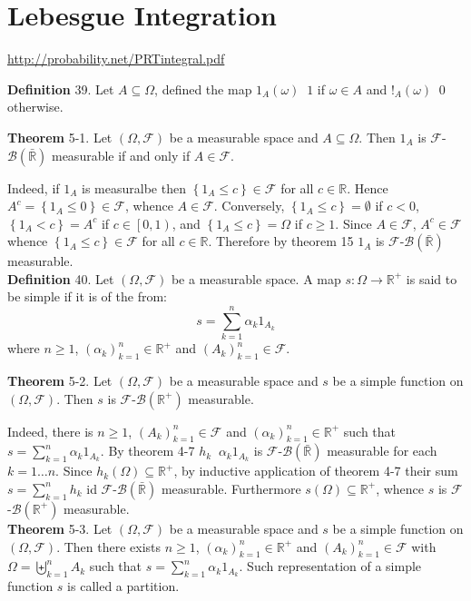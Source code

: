 \documentclass[a4paper]{article}
\newcommand{\obj}[1]{\left\{ #1 \right \}}
\newcommand{\clop}[1]{\left [ #1 \right )}
\newcommand{\brac}[1]{\left ( #1 \right )}
\newcommand{\Rbar}{{\bar{\mathbb{R}}}}
\newcommand{\Real}{\mathbb{R}}
\newcommand{\Fcal}{\mathcal{F}}
\newcommand{\borel}[1]{\mathcal{B}\brac{#1}}
\newcommand{\defn}{\mathop{\overset{\Delta}{=}}\nolimits}
\begin{document}
\section{Lebesgue Integration} %
\label{sec:tut_5}
\url{http://probability.net/PRTintegral.pdf}

\noindent \textbf{Definition} 39.
Let $A\subseteq \Omega$, defined the map $1_A\brac{\omega}\defn 1$ if $
\omega\in A$ and $!_A\brac{\omega}\defn 0$ otherwise.

\label{thm:indicator} \noindent \textbf{Theorem} 5-1.
Let $\brac{\Omega, \Fcal}$ be a measurable space and $A\subseteq \Omega$. Then $1_A$ is $\Fcal$-$\borel{\Rbar}$ measurable if and only if $A\in \Fcal$.

Indeed, if $1_A$ is measuralbe then $\obj{1_A\leq c}\in \Fcal$ for all $c\in \Real$. Hence $A^c=\obj{1_A\leq 0}\in \Fcal$, whence $A\in \Fcal$. Conversely, $\obj{1_A \leq c}=\emptyset$ if $c<0$, $\obj{1_A < c}=A^c$ if $c\in \clop{0,1}$,  and $\obj{1_A\leq c}=\Omega$ if $c\geq 1$. Since $A\in \Fcal$, $A^c\in \Fcal$ whence $\obj{1_A\leq c}\in\Fcal$ for all $c\in \Real$. Therefore by theorem 15 $1_A$ is $\Fcal$-$\borel{\Rbar}$ measurable.\\

\noindent \textbf{Definition} 40.
Let $\brac{\Omega, \Fcal}$ be a measurable space. A map $s:\Omega\to\Real^+$ is said to be simple if it is of the from: \[s = \sum_{k=1}^n \alpha_k 1_{A_k}\] where $n\geq 1$, $\brac{\alpha_k}_{k=1}^n \in \Real^+$ and $\brac{A_k}_{k=1}^n \in \Fcal$.

\label{thm:simple_meas} \noindent \textbf{Theorem} 5-2.
Let $\brac{\Omega, \Fcal}$ be a measurable space and $s$ be a simple function on $\brac{\Omega, \Fcal}$. Then $s$ is $\Fcal$-$\borel{\Real^+}$ measurable.

Indeed, there is $n\geq1$, $\brac{A_k}_{k=1}^n\in \Fcal$ and $\brac{\alpha_k}_{k=1}^n\in \Real^+$ such that $s=\sum_{k=1}^n \alpha_k 1_{A_k}$. By theorem 4-7 $h_k\defn \alpha_k 1_{A_k}$ is $\Fcal$-$\borel{\Rbar}$ measurable for each $k=1\ldots n$. Since $h_k\brac{\Omega}\subseteq \Real^+$, by inductive application of theorem 4-7 their sum $s=\sum_{k=1}^n h_k$ id $\Fcal$-$\borel{\Rbar}$ measurable. Furthermore $s\brac{\Omega}\subseteq \Real^+$, whence $s$ is $\Fcal$-$\borel{\Real^+}$ measurable.\\

\label{thm:simple_partition} \noindent \textbf{Theorem} 5-3.
Let $\brac{\Omega, \Fcal}$ be a measurable space and $s$ be a simple function on $\brac{\Omega, \Fcal}$. Then there exists $n\geq 1$, $\brac{\alpha_k}_{k=1}^n\in\Real^+$ and $\brac{A_k}_{k=1}^n\in \Fcal$ with $\Omega=\biguplus_{k=1}^n A_k$ such that $s=\sum_{k=1}^n \alpha_k 1_{A_k}$. Such representation of a simple function $s$ is called a partition.
\end{document}
